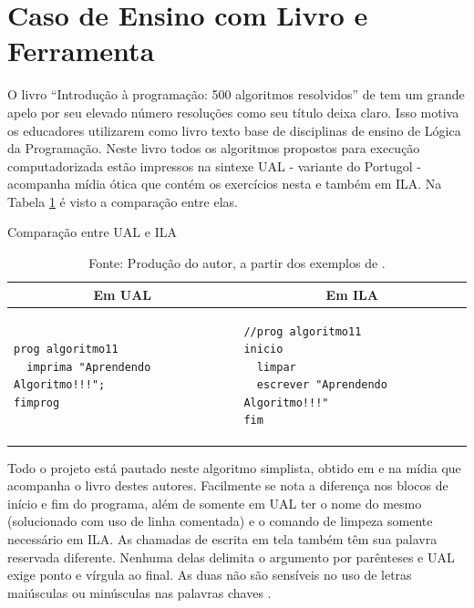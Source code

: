 \section{Caso de Ensino com Livro e Ferramenta}

O livro ``Introdução à programação: 500 algoritmos resolvidos'' de  tem um grande apelo por seu elevado número resoluções como seu título deixa claro. Isso motiva os educadores utilizarem como livro texto base de disciplinas de ensino de Lógica da Programação. Neste livro todos os algoritmos propostos para execução computadorizada estão impressos na sintexe UAL - variante do Portugol - acompanha mídia ótica que contém os exercícios nesta e também em ILA. Na Tabela \ref{tab:compare-ualila} é visto a comparação entre elas.

\begin{table}[h]
\centering
  \caption{Comparação entre UAL e ILA}\label{tab:compare-ualila}
\begin{tabular}{p{75mm} | p{75mm}}\hline
\multicolumn{1}{c|}{\textbf{Em UAL}} & \multicolumn{1}{c}{\textbf{Em ILA}} \\ \hline
\begin{lstlisting}[language=ual,style=table]
prog algoritmo11
  imprima "Aprendendo Algoritmo!!!";
fimprog
\end{lstlisting} &
\begin{lstlisting}[language=ila,style=table]
//prog algoritmo11
inicio
  limpar
  escrever "Aprendendo Algoritmo!!!"
fim
\end{lstlisting} \\ \hline
\end{tabular}
  \caption*{\ifdraft{\color{green}}{}\footnotesize Fonte: Produção do autor, a partir dos exemplos de .}
\end{table}

Todo o projeto está pautado neste algoritmo simplista, obtido em  e na mídia que acompanha o livro destes autores. Facilmente se nota a diferença nos blocos de início e fim do programa, além de somente em UAL ter o nome do mesmo (solucionado com uso de linha comentada) e o comando de limpeza somente necessário em ILA. As chamadas de escrita em tela também têm sua palavra reservada diferente. Nenhuma delas delimita o argumento por parênteses e UAL exige ponto e vírgula ao final. As duas não são sensíveis no uso de letras maiúsculas ou minúsculas nas palavras chaves .

